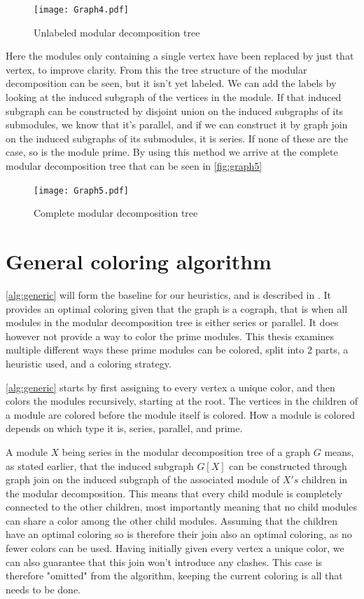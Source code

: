 \documentclass[a4paper]{article}
\begin{document}
\begin{figure}[H]
    \texttt{[image: Graph4.pdf]}
    \caption{Unlabeled modular decomposition tree}
    \label{fig:graph4}
\end{figure}

Here the modules only containing a single vertex have been replaced by just that
vertex, to improve clarity. From this the tree structure of the modular
decomposition can be seen, but it isn't yet labeled. We can add the labels by 
looking at the induced subgraph of the vertices in the module. If that induced
subgraph can be constructed by disjoint union on the induced subgraphs of its
submodules, we know that it's parallel, and if we can construct it by graph join on
the induced subgraphs of its submodules, it is series. If none of these are
the case, so is the module prime. By using this method we arrive at the complete
modular decomposition tree that can be seen in \autoref{fig:graph5}

\begin{figure}[h!]
    \texttt{[image: Graph5.pdf]}
    \caption{Complete modular decomposition tree}
    \label{fig:graph5}
\end{figure}

\FloatBarrier

\section{General coloring algorithm}
\label{sec:generic}

\autoref{alg:generic} will form the baseline for our heuristics, and is described in
\cite{HCL}. It provides an optimal coloring given that the graph is a cograph,
that is when all modules in the modular decomposition tree is either series or
parallel.  It does however not provide a way to color the prime modules. This
thesis examines multiple different ways these prime modules can be colored, split
into 2 parts, a heuristic used, and a coloring strategy. 

\autoref{alg:generic} starts by first assigning to every vertex a unique color,
and then colors the modules recursively, starting at the root. The vertices in
the children of a module are colored before the module itself is colored. How a
module is colored depends on which type it is, series, parallel, and prime.

A module $X$ being series in the modular decomposition tree of a graph $G$
means, as stated earlier, that the induced subgraph $G[X]$ can be constructed
through graph join on the induced subgraph of the associated module of $X's$
children in the modular decomposition. This means that every child module is
completely connected to the other children, most importantly meaning that no
child modules can share a color among the other child modules. Assuming that
the children have an optimal coloring so is therefore their join also an optimal
coloring, as no fewer colors can be used. Having initially given every vertex a
unique color, we can also guarantee that this join won't introduce any clashes.
This case is therefore "omitted" from the algorithm, keeping
the current coloring is all that needs to be done.
\end{document}
